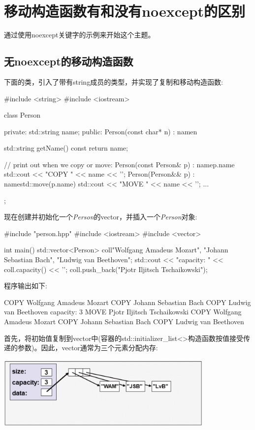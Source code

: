 \section{移动构造函数有和没有noexcept的区别}
通过使用noexcept关键字的示例来开始这个主题。

\subsection{无noexcept的移动构造函数}

下面的类，引入了带有string成员的类型，并实现了复制和移动构造函数:

\begin{cppcode}
#include <string>
#include <iostream>

class Person {
	private:
	std::string name;
	public:
	Person(const char* n)
	: name{n} {
	}

	std::string getName() const {
		return name;
	}

	// print out when we copy or move:
	Person(const Person& p)
	: name{p.name} {
		std::cout << "COPY " << name << '\n';
	}
	Person(Person&& p)
	: name{std::move(p.name)} {
		std::cout << "MOVE " << name << '\n';
	}
	...
};
\end{cppcode}

现在创建并初始化一个\textit{Person}的vector，并插入一个\textit{Person}对象:

\begin{cppcode}
#include "person.hpp"
#include <iostream>
#include <vector>

int main()
{
	std::vector<Person> coll{"Wolfgang Amadeus Mozart",
		"Johann Sebastian Bach",
		"Ludwig van Beethoven"};
	std::cout << "capacity: " << coll.capacity() << '\n';
	coll.push_back("Pjotr Iljitsch Tschaikowski");
}
\end{cppcode}

程序输出如下:

\begin{outputcode}
COPY Wolfgang Amadeus Mozart
COPY Johann Sebastian Bach
COPY Ludwig van Beethoven
capacity: 3
MOVE Pjotr Iljitsch Tschaikowski
COPY Wolfgang Amadeus Mozart
COPY Johann Sebastian Bach
COPY Ludwig van Beethoven
\end{outputcode}

首先，将初始值复制到vector中(容器的std::initializer_list<>构造函数按值接受传递的参数)。因此，vector通常为三个元素分配内存:

\begin{center}
	\includegraphics[width=0.8\textwidth]{part1/ch7/images/1}
\end{center}

